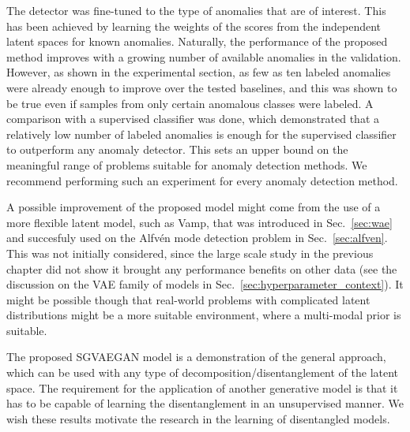 The detector was fine-tuned to the type of anomalies that are of interest. This has been achieved by learning the weights of the scores from the independent latent spaces for known anomalies. Naturally, the performance of the proposed method improves with a growing number of available anomalies in the validation. However, as shown in the experimental section, as few as ten labeled anomalies were already enough to improve over the tested baselines, and this was shown to be true even if samples from only certain anomalous classes were labeled. A comparison with a supervised classifier was done, which demonstrated that a relatively low number of labeled anomalies is enough for the supervised classifier to outperform any anomaly detector. This sets an upper bound on the meaningful range of problems suitable for anomaly detection methods. We recommend performing such an experiment for every anomaly detection method. 

A possible improvement of the proposed model might come from the use of a more flexible latent model, such as Vamp, that was introduced in Sec.~\ref{sec:wae} and succesfuly used on the Alfvén mode detection problem in Sec.~\ref{sec:alfven}. This was not initially considered, since the large scale study in the previous chapter did not show it brought any performance benefits on other data (see the discussion on the VAE family of models in Sec.~\ref{sec:hyperparameter_context}). It might be possible though that real-world problems with complicated latent distributions might be a more suitable environment, where a multi-modal prior is suitable.

The proposed SGVAEGAN model is a demonstration of the general approach, which can be used with any type of decomposition/disentanglement of the latent space. The requirement for the application of another generative model is that it has to be capable of learning the disentanglement in an unsupervised manner. We wish these results motivate the research in the learning of disentangled models.